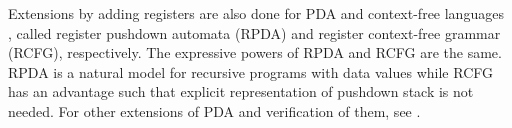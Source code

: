 Extensions by adding registers are also done for PDA \cite{CL15,MRT17,STS21} and
context-free languages \cite{CK98,STS18,STS19},
called register pushdown automata (RPDA) and register context-free grammar (RCFG), respectively.
The expressive powers of RPDA and RCFG are the same.
RPDA is a natural model for recursive programs with data values while
RCFG has an advantage such that explicit representation of pushdown stack is not needed.
For other extensions of PDA and verification of them, see \cite{ST12,XO13,RBB10}.
